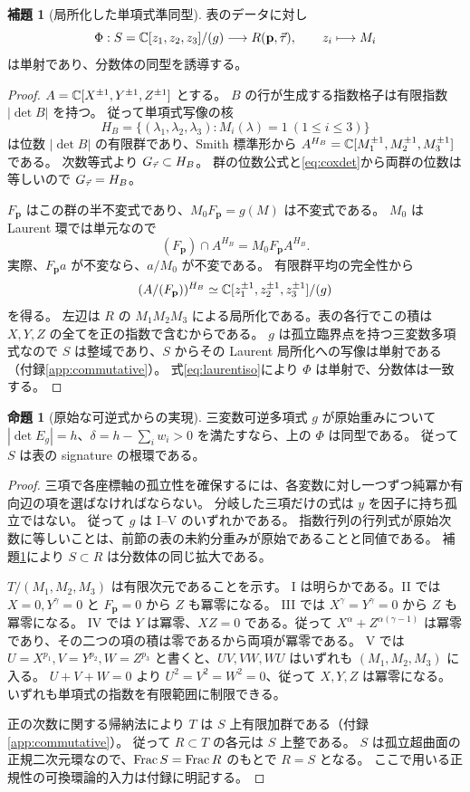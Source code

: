 \documentclass[11pt,a4paper]{ltjsarticle}
\numberwithin{equation}{section}
\theoremstyle{definition}
\newtheorem{proposition}[theorem]{命題}
\newtheorem{lemma}[theorem]{補題}
\newcommand{\bp}{\mathbf p}\newcommand{\bw}{\mathbf w}\newcommand{\one}{\mathbf 1}
\begin{document}
\begin{lemma}[局所化した単項式準同型]\label{lem:coxlocal}
表のデータに対し
\[
 \Phi:S=\C[z_1,z_2,z_3]/(g)\longrightarrow R(\bp,\ta),
 \qquad z_i\longmapsto M_i
\]
は単射であり、分数体の同型を誘導する。
\end{lemma}
\begin{proof}
$A=\mathbb C[X^{\pm1},Y^{\pm1},Z^{\pm1}]$ とする。
$B$ の行が生成する指数格子は有限指数 $|\det B|$ を持つ。
従って単項式写像の核
\[
 H_B=\{(\lambda_1,\lambda_2,\lambda_3):M_i(\lambda)=1\ (1\le i\le3)\}
\]
は位数 $|\det B|$ の有限群であり、Smith 標準形から
$A^{H_B}=\mathbb C[M_1^{\pm1},M_2^{\pm1},M_3^{\pm1}]$ である。
次数等式より $G_{\vec\tau}\subset H_B$。
群の位数公式と\eqref{eq:coxdet}から両群の位数は等しいので $G_{\vec\tau}=H_B$。

$F_{\bp}$ はこの群の半不変式であり、$M_0F_{\bp}=g(M)$ は不変式である。
$M_0$ は Laurent 環では単元なので
\[
 (F_{\bp})\cap A^{H_B}=M_0F_{\bp}A^{H_B}.
\]
実際、$F_{\bp}a$ が不変なら、$a/M_0$ が不変である。
有限群平均の完全性から
\begin{equation}\label{eq:laurentiso}
 (A/(F_{\bp}))^{H_B}
 \simeq\C[z_1^{\pm1},z_2^{\pm1},z_3^{\pm1}]/(g)
\end{equation}
を得る。
左辺は $R$ の $M_1M_2M_3$ による局所化である。表の各行でこの積は $X,Y,Z$ の全てを正の指数で含むからである。
$g$ は孤立臨界点を持つ三変数多項式なので $S$ は整域であり、$S$ からその Laurent 局所化への写像は単射である（付録\ref{app:commutative}）。
式\eqref{eq:laurentiso}により $\Phi$ は単射で、分数体は一致する。
\end{proof}

\begin{proposition}[原始な可逆式からの実現]\label{prop:principalrealization}
三変数可逆多項式 $g$ が原始重みについて $|\det E_g|=h$、$\delta=h-\sum_iw_i>0$ を満たすなら、上の $\Phi$ は同型である。
従って $S$ は表の signature の根環である。
\end{proposition}
\begin{proof}
三項で各座標軸の孤立性を確保するには、各変数に対し一つずつ純冪か有向辺の項を選ばなければならない。
分岐した三項だけの式は $y$ を因子に持ち孤立ではない。
従って $g$ は I--V のいずれかである。
指数行列の行列式が原始次数に等しいことは、前節の表の未約分重みが原始であることと同値である。
補題\ref{lem:coxlocal}により $S\subset R$ は分数体の同じ拡大である。

$T/(M_1,M_2,M_3)$ は有限次元であることを示す。
I は明らかである。II では $X=0,Y^\gamma=0$ と $F_{\bp}=0$ から $Z$ も冪零になる。
III では $X^\gamma=Y^\gamma=0$ から $Z$ も冪零になる。
IV では $Y$ は冪零、$XZ=0$ である。従って
$X^\alpha+Z^{\alpha(\gamma-1)}$ は冪零であり、その二つの項の積は零であるから両項が冪零である。
V では $U=X^{p_1},V=Y^{p_2},W=Z^{p_3}$ と書くと、$UV,VW,WU$ はいずれも $(M_1,M_2,M_3)$ に入る。
$U+V+W=0$ より $U^2=V^2=W^2=0$、従って $X,Y,Z$ は冪零になる。
いずれも単項式の指数を有限範囲に制限できる。

正の次数に関する帰納法により $T$ は $S$ 上有限加群である（付録\ref{app:commutative}）。
従って $R\subset T$ の各元は $S$ 上整である。
$S$ は孤立超曲面の正規二次元環なので、$\operatorname{Frac} S=\operatorname{Frac} R$ のもとで $R=S$ となる。
ここで用いる正規性の可換環論的入力は付録に明記する。
\end{proof}
\end{document}
